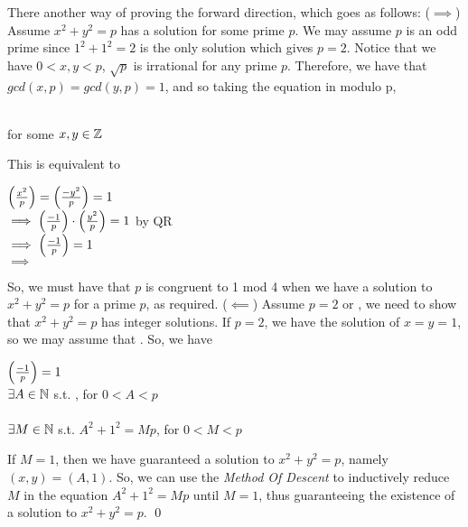 \documentclass[../main.tex]{subfiles}
\begin{document}
\begin{pf}[Cont.]
    There another way of proving the forward direction, which goes as follows: \sspace ($\implies$)
    Assume $x^2+y^2=p$ has a solution for some prime $p$. We may assume $p$ is an odd prime since $1^2+1^2=2$ is the only solution which gives $p=2$. Notice that we have $0 < x,y < p$, $\sqrt{p}$ is irrational for any prime $p$. Therefore, we have that $gcd(x,p)=gcd(y,p)=1$, and so taking the equation in modulo p,
    \begin{center}
         \\
         for some $x,y \in \mathbb{Z}$
    \end{center}
    This is equivalent to
    \begin{center}
        $\Big(\frac{x^2}{p}\Big)=\Big(\frac{-y^2}{p}\Big)=1$ \\
        $\implies \Big(\frac{-1}{p}\Big)\cdot\Big(\frac{y^2}{p}\Big)=1$ by QR \\
        $\implies \Big(\frac{-1}{p}\Big)=1$ \\
        $\implies$  \\
    \end{center}
    So, we must have that $p$ is congruent to 1 mod 4 when we have a solution to $x^2+y^2=p$ for a prime $p$, as required. \sspace
    ($\impliedby$)
    Assume $p=2$ or , we need to show that $x^2+y^2=p$ has integer solutions. If $p=2$, we have the solution of $x=y=1$, so we may assume that . So, we have 
    \begin{center}
        $\Big(\frac{-1}{p}\Big)=1$ \\
        $\exists A \in \mathbb{N}$ s.t. , for $0 < A < p$ \\
         \\
        $\exists M \in \mathbb{N}$ s.t. $A^2+1^2=Mp$, for $0 < M < p$
    \end{center}
    If $M=1$, then we have guaranteed a solution to $x^2+y^2=p$, namely $(x,y)=(A,1)$. So, we can use the \textit{Method Of Descent} to inductively reduce $M$ in the equation $A^2+1^2=Mp$ until $M=1$,  thus guaranteeing the existence of a solution to $x^2+y^2=p$. \qed
\end{pf}
\end{document}
